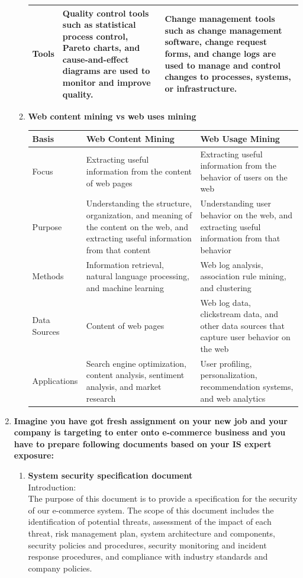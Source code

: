 \documentclass[12pt]{article}
\begin{document}
\begin{enumerate}
\begin{enumerate}
\begin{longtable}{|C{3cm}|L{4.5cm}|L{4.5cm}|}
            \hline
            Tools & Quality control tools such as statistical process control, Pareto charts, and cause-and-effect diagrams are used to monitor and improve quality. & Change management tools such as change management software, change request forms, and change logs are used to manage and control changes to processes, systems, or infrastructure. \\
            \hline
            \end{longtable}
            \item{\bfseries Web content mining vs web uses mining}
            \begin{longtable}{ |C{3cm}|L{4.5cm}|L{4.5cm}| }
                \hline
                \textbf{Basis} & \textbf{Web Content Mining} & \textbf{Web Usage Mining} \\
                \hline
                Focus & Extracting useful information from the content of web pages & Extracting useful information from the behavior of users on the web \\
                \hline
                Purpose & Understanding the structure, organization, and meaning of the content on the web, and extracting useful information from that content & Understanding user behavior on the web, and extracting useful information from that behavior \\
                \hline
                Methods & Information retrieval, natural language processing, and machine learning & Web log analysis, association rule mining, and clustering \\
                \hline
                Data Sources & Content of web pages & Web log data, clickstream data, and other data sources that capture user behavior on the web \\
                \hline
                Applications & Search engine optimization, content analysis, sentiment analysis, and market research & User profiling, personalization, recommendation systems, and web analytics \\
                \hline
                \end{longtable}
    \end{enumerate}
    \item {\bfseries Imagine you have got fresh assignment on your new job and your company is targeting to enter onto e-commerce business and you have to prepare following documents based on
    your IS expert exposure:}
    \begin{enumerate}
        \item {\bfseries System security specification document\\}
Introduction:\\
The purpose of this document is to provide a specification for the security of our e-commerce system. The scope of this document includes the identification of potential threats, assessment of the impact of each threat, risk management plan, system architecture and components, security policies and procedures, security monitoring and incident response procedures, and compliance with industry standards and company policies.


\end{enumerate}
\end{enumerate}
\end{document}
